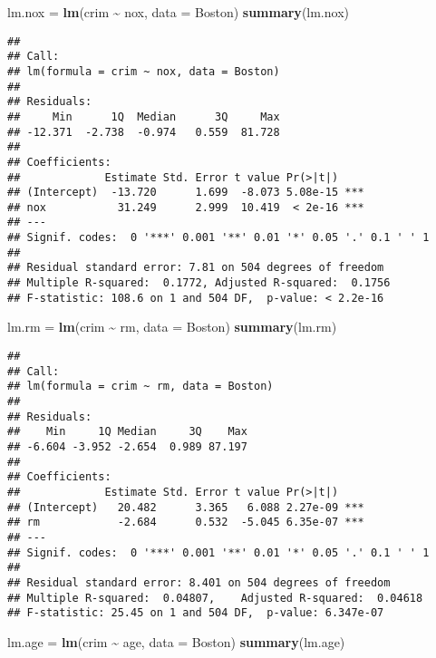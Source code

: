 \documentclass[
]{article}
\newenvironment{Shaded}{\begin{snugshade}}{\end{snugshade}}
\newcommand{\AttributeTok}[1]{\textcolor[rgb]{0.13,0.29,0.53}{#1}}
\newcommand{\FunctionTok}[1]{\textcolor[rgb]{0.13,0.29,0.53}{\textbf{#1}}}
\newcommand{\NormalTok}[1]{#1}
\newcommand{\OtherTok}[1]{\textcolor[rgb]{0.56,0.35,0.01}{#1}}
\newcommand{\SpecialCharTok}[1]{\textcolor[rgb]{0.81,0.36,0.00}{\textbf{#1}}}
\begin{document}
\begin{Shaded}
\begin{Highlighting}[]
\NormalTok{lm.nox }\OtherTok{=} \FunctionTok{lm}\NormalTok{(crim }\SpecialCharTok{\textasciitilde{}}\NormalTok{ nox, }\AttributeTok{data =}\NormalTok{ Boston)}
\FunctionTok{summary}\NormalTok{(lm.nox)}
\end{Highlighting}
\end{Shaded}

\begin{verbatim}
## 
## Call:
## lm(formula = crim ~ nox, data = Boston)
## 
## Residuals:
##     Min      1Q  Median      3Q     Max 
## -12.371  -2.738  -0.974   0.559  81.728 
## 
## Coefficients:
##             Estimate Std. Error t value Pr(>|t|)    
## (Intercept)  -13.720      1.699  -8.073 5.08e-15 ***
## nox           31.249      2.999  10.419  < 2e-16 ***
## ---
## Signif. codes:  0 '***' 0.001 '**' 0.01 '*' 0.05 '.' 0.1 ' ' 1
## 
## Residual standard error: 7.81 on 504 degrees of freedom
## Multiple R-squared:  0.1772, Adjusted R-squared:  0.1756 
## F-statistic: 108.6 on 1 and 504 DF,  p-value: < 2.2e-16
\end{verbatim}

\begin{Shaded}
\begin{Highlighting}[]
\NormalTok{lm.rm }\OtherTok{=} \FunctionTok{lm}\NormalTok{(crim }\SpecialCharTok{\textasciitilde{}}\NormalTok{ rm, }\AttributeTok{data =}\NormalTok{ Boston)}
\FunctionTok{summary}\NormalTok{(lm.rm)}
\end{Highlighting}
\end{Shaded}

\begin{verbatim}
## 
## Call:
## lm(formula = crim ~ rm, data = Boston)
## 
## Residuals:
##    Min     1Q Median     3Q    Max 
## -6.604 -3.952 -2.654  0.989 87.197 
## 
## Coefficients:
##             Estimate Std. Error t value Pr(>|t|)    
## (Intercept)   20.482      3.365   6.088 2.27e-09 ***
## rm            -2.684      0.532  -5.045 6.35e-07 ***
## ---
## Signif. codes:  0 '***' 0.001 '**' 0.01 '*' 0.05 '.' 0.1 ' ' 1
## 
## Residual standard error: 8.401 on 504 degrees of freedom
## Multiple R-squared:  0.04807,    Adjusted R-squared:  0.04618 
## F-statistic: 25.45 on 1 and 504 DF,  p-value: 6.347e-07
\end{verbatim}

\begin{Shaded}
\begin{Highlighting}[]
\NormalTok{lm.age }\OtherTok{=} \FunctionTok{lm}\NormalTok{(crim }\SpecialCharTok{\textasciitilde{}}\NormalTok{ age, }\AttributeTok{data =}\NormalTok{ Boston)}
\FunctionTok{summary}\NormalTok{(lm.age)}
\end{Highlighting}
\end{Shaded}
\end{document}
